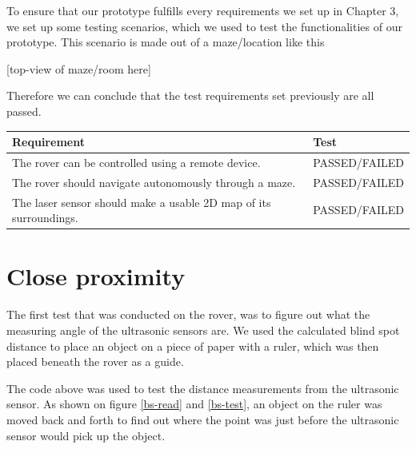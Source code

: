 To ensure that our prototype fulfills every requirements we set up in Chapter 3, we set up some testing scenarios, which we used to test the functionalities of our prototype. This scenario is made out of a maze/location like this

[top-view of maze/room here]



Therefore we can conclude that the test requirements set previously are all passed.

\begin{table}[H]
	\begin{tabular}{|l|l|}
		\hline
		\textbf{Requirement} & \textbf{Test} \\ \hline
		The rover can be controlled using a remote device. & PASSED/FAILED \\ \hline
		The rover should navigate autonomously through a maze. & PASSED/FAILED \\ \hline
		The laser sensor should make a usable 2D map of its surroundings. & PASSED/FAILED \\ \hline
	\end{tabular}
\end{table}

\clearpage
\section{Close proximity}

The first test that was conducted on the rover, was to figure out what the measuring angle of the ultrasonic sensors are. We used the calculated blind spot distance to place an object on a piece of paper with a ruler, which was then placed beneath the rover as a guide.



The code above was used to test the distance measurements from the ultrasonic sensor. As shown on figure \ref{bs-read} and \ref{bs-test}, an object on the ruler was moved back and forth to find out where the point was just before the ultrasonic sensor would pick up the object.

